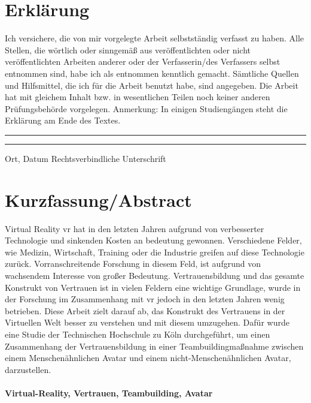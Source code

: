 \documentclass[a4paper,11pt]{article}%
\renewcommand{\\}{\vspace*{0.5\baselineskip} \newline}
\begin{document}
	\section*{Erklärung}
	Ich versichere, die von mir vorgelegte Arbeit selbstständig verfasst zu haben. Alle Stellen, die wörtlich oder sinngemäß aus veröffentlichten oder nicht veröffentlichten Arbeiten anderer oder der Verfasserin/des Verfassers selbst entnommen sind, habe ich als entnommen kenntlich gemacht. Sämtliche Quellen und Hilfsmittel, die ich für die Arbeit benutzt habe, sind angegeben. Die Arbeit hat mit gleichem Inhalt bzw. in wesentlichen Teilen noch keiner anderen Prüfungsbehörde vorgelegen.\\
	Anmerkung: In einigen Studiengängen steht die Erklärung am Ende des Textes.\\
	~\\
	~\\
	\rule{0.35\textwidth}{0.4pt} \hspace*{3cm} \rule{0.45\textwidth}{0.4pt} \newline
	Ort, Datum	\hspace*{6.3cm}	Rechtsverbindliche Unterschrift
	\newpage
	\section*{Kurzfassung/Abstract}
	Virtual Reality \ac{vr} hat in den letzten Jahren aufgrund von verbesserter Technologie und sinkenden Kosten an bedeutung gewonnen. Verschiedene Felder, wie Medizin, Wirtschaft, Training oder die Industrie greifen auf diese Technologie zurück. Vorranschreitende Forschung in diesem Feld, ist aufgrund von wachsendem Interesse von großer Bedeutung. Vertrauensbildung und das gesamte Konstrukt von Vertrauen ist in vielen Feldern eine wichtige Grundlage, wurde in der Forschung im Zusammenhang mit \ac{vr} jedoch in den letzten Jahren wenig betrieben. Diese Arbeit zielt darauf ab, das Konstrukt des Vertrauens in der Virtuellen Welt besser zu verstehen und mit diesem umzugehen. Dafür wurde eine Studie der Technischen Hochschule zu Köln durchgeführt, um einen Zusammenhang der Vertrauensbildung in einer Teambuildingmaßnahme zwischen einem Menschenähnlichen Avatar und einem nicht-Menschenähnlichen Avatar, darzustellen.
	
	\paragraph{Virtual-Reality, Vertrauen, Teambuilding, Avatar}
	\newpage
	\tableofcontents
	\newpage
	
\end{document}
